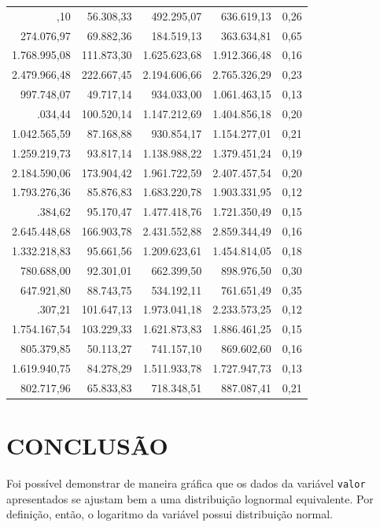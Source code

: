 \documentclass[a4paper]{article}
\begin{document}
\begin{table}
\begin{tabular}[t]{rrrrr}
\addlinespace
564.457,10 & 56.308,33 & 492.295,07 & 636.619,13 & 0,26\\
274.076,97 & 69.882,36 & 184.519,13 & 363.634,81 & 0,65\\
1.768.995,08 & 111.873,30 & 1.625.623,68 & 1.912.366,48 & 0,16\\
2.479.966,48 & 222.667,45 & 2.194.606,66 & 2.765.326,29 & 0,23\\
997.748,07 & 49.717,14 & 934.033,00 & 1.061.463,15 & 0,13\\
\addlinespace
1.276.034,44 & 100.520,14 & 1.147.212,69 & 1.404.856,18 & 0,20\\
1.042.565,59 & 87.168,88 & 930.854,17 & 1.154.277,01 & 0,21\\
1.259.219,73 & 93.817,14 & 1.138.988,22 & 1.379.451,24 & 0,19\\
2.184.590,06 & 173.904,42 & 1.961.722,59 & 2.407.457,54 & 0,20\\
1.793.276,36 & 85.876,83 & 1.683.220,78 & 1.903.331,95 & 0,12\\
\addlinespace
1.599.384,62 & 95.170,47 & 1.477.418,76 & 1.721.350,49 & 0,15\\
2.645.448,68 & 166.903,78 & 2.431.552,88 & 2.859.344,49 & 0,16\\
1.332.218,83 & 95.661,56 & 1.209.623,61 & 1.454.814,05 & 0,18\\
780.688,00 & 92.301,01 & 662.399,50 & 898.976,50 & 0,30\\
647.921,80 & 88.743,75 & 534.192,11 & 761.651,49 & 0,35\\
\addlinespace
2.103.307,21 & 101.647,13 & 1.973.041,18 & 2.233.573,25 & 0,12\\
1.754.167,54 & 103.229,33 & 1.621.873,83 & 1.886.461,25 & 0,15\\
805.379,85 & 50.113,27 & 741.157,10 & 869.602,60 & 0,16\\
1.619.940,75 & 84.278,29 & 1.511.933,78 & 1.727.947,73 & 0,13\\
802.717,96 & 65.833,83 & 718.348,51 & 887.087,41 & 0,21\\
\bottomrule
\end{tabular}
\end{table}

\section{CONCLUSÃO}\label{conclusao}

Foi possível demonstrar de maneira gráfica que os dados da variável
\texttt{valor} apresentados se ajustam bem a uma distribuição lognormal
equivalente. Por definição, então, o logaritmo da variável possui
distribuição normal.
\end{document}
